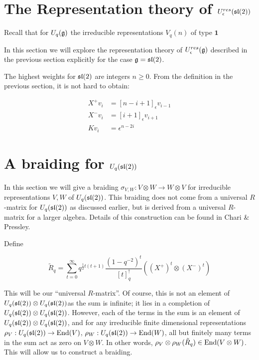 \section{The Representation theory of $U_\epsilon^{res}(\mathfrak{sl}(2))$}
\label{RepTheoryofResSL2}

Recall that for $U_q(\mathfrak{g})$ the irreducible representations $V_q(n)$ of type $\mathbf{1}$

In this section we will explore the representation theory of
$U_\epsilon^{res}(\mathfrak{g})$ described in the previous section explicitly for the
case $\mathfrak{g} = \mathfrak{sl}(2)$.

The highest weights for $\mathfrak{sl}(2)$ are integers $n \geq 0$. From the definition
in the previous section, it is not hard to obtain:

\begin{align}
     X^+ v_i &= [n-i+1]_\epsilon v_{i-1} \\
    X^-v_i &= [i+1]_\epsilon v_{i+1} \\
    Kv_i &= \epsilon^{n-2i}
\end{align}

\section{A braiding for $U_q(\mathfrak{sl}(2))$}


In this section we will give a braiding $\sigma_{V,W}: V \otimes W \to W
\otimes V$ for irreducible representations $V,W$ of $U_q(\mathfrak{sl}(2))$. This
braiding does not come from a universal $R$-matrix for $U_q(\mathfrak{sl}(2))$ as
discussed earlier, but is derived from a universal $R$-matrix for a larger
algebra. Details of this construction can be found in Chari \& Pressley.


Define 

\begin{equation}
\tilde{R}_q = \sum_{t=0}^\infty q^{\frac{1}{2} t(t+1)} \frac{(1-q^{-2})^t}{[t]_q^{!}} ((X^+)^t \otimes (X^-)^t)
\end{equation}

This will be our ``universal $R$-matrix''. Of course, this is not an element of
$U_q(\mathfrak{sl}(2)) \otimes U_q(\mathfrak{sl}(2))$as the sum is infinite; it lies in a
completion of $U_q(\mathfrak{sl}(2)) \otimes U_q(\mathfrak{sl}(2))$. However, each of the terms
in the sum is an element of $U_q(\mathfrak{sl}(2)) \otimes U_q(\mathfrak{sl}(2))$, and for any
irreducible finite dimensional representations $\rho_V : U_q(\mathfrak{sl}(2)) \to
\operatorname{End}(V)$, $\rho_W : U_q(\mathfrak{sl}(2)) \to \operatorname{End}(W)$, all but finitely many terms in the
sum act as zero on $V \otimes W$. In other words, $\rho_V \otimes \rho_W
(\tilde{R}_q) \in \operatorname{End}(V \otimes W)$. This will allow us to construct a
braiding.


